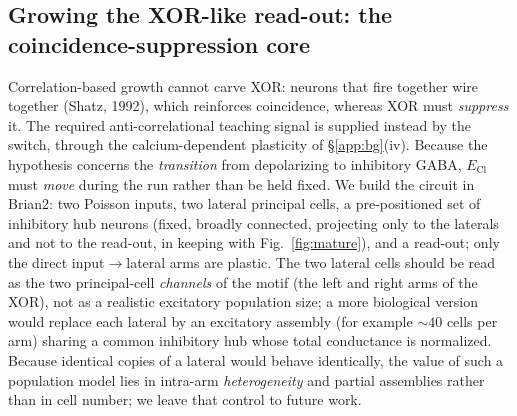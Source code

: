\documentclass[11pt,a4paper]{article}
\newcommand{\ECl}{E_{\mathrm{Cl}}}
\begin{document}
\FloatBarrier
\subsection{Growing the XOR-like read-out: the coincidence-suppression core}\label{app:growth}
Correlation-based growth cannot carve XOR: neurons that fire together wire together (Shatz, 1992), which reinforces coincidence, whereas XOR must \emph{suppress} it. The required anti-correlational teaching signal is supplied instead by the switch, through the calcium-dependent plasticity of \S\ref{app:bg}(iv). Because the hypothesis concerns the \emph{transition} from depolarizing to inhibitory GABA, $\ECl$ must \emph{move} during the run rather than be held fixed. We build the circuit in Brian2: two Poisson inputs, two lateral principal cells, a pre-positioned set of inhibitory hub neurons (fixed, broadly connected, projecting only to the laterals and not to the read-out, in keeping with Fig.~\ref{fig:mature}), and a read-out; only the direct input$\to$lateral arms are plastic. The two lateral cells should be read as the two principal-cell \emph{channels} of the motif (the left and right arms of the XOR), not as a realistic excitatory population size; a more biological version would replace each lateral by an excitatory assembly (for example ${\sim}40$ cells per arm) sharing a common inhibitory hub whose total conductance is normalized. Because identical copies of a lateral would behave identically, the value of such a population model lies in intra-arm \emph{heterogeneity} and partial assemblies rather than in cell number; we leave that control to future work.
\end{document}
